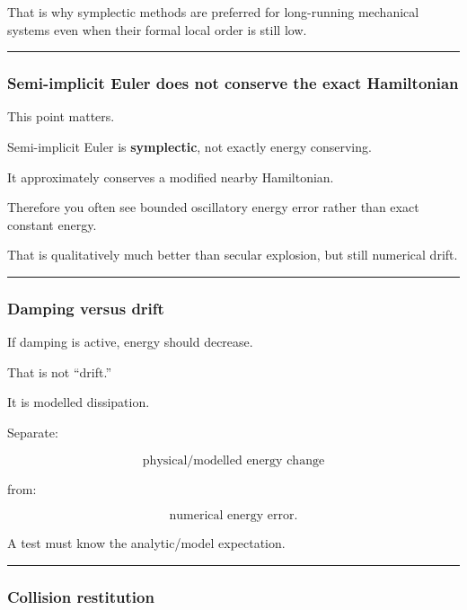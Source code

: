 That is why symplectic methods are preferred for long-running mechanical systems even when their formal local order is still low.

\begin{center}\rule{0.5\linewidth}{0.5pt}\end{center}

\subsubsection{Semi-implicit Euler does not conserve the exact Hamiltonian}\label{semi-implicit-euler-does-not-conserve-the-exact-hamiltonian}

This point matters.

Semi-implicit Euler is \textbf{symplectic}, not exactly energy conserving.

It approximately conserves a modified nearby Hamiltonian.

Therefore you often see bounded oscillatory energy error rather than exact constant energy.

That is qualitatively much better than secular explosion, but still numerical drift.

\begin{center}\rule{0.5\linewidth}{0.5pt}\end{center}

\subsubsection{Damping versus drift}\label{damping-versus-drift}

If damping is active, energy should decrease.

That is not ``drift.''

It is modelled dissipation.

Separate:

\[
\boxed{
\text{physical/modelled energy change}
}
\]

from:

\[
\boxed{
\text{numerical energy error}.
}
\]

A test must know the analytic/model expectation.

\begin{center}\rule{0.5\linewidth}{0.5pt}\end{center}

\subsubsection{Collision restitution}\label{collision-restitution}

